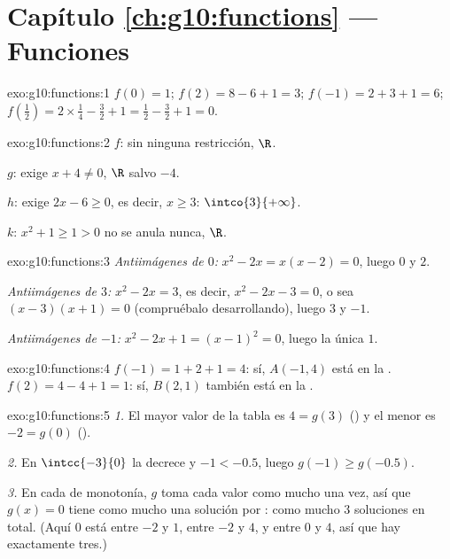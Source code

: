\section*{Capítulo \ref{ch:g10:functions} --- Funciones}

\begin{solution}{exo:g10:functions:1}
$f(0) = 1$; \quad $f(2) = 8 - 6 + 1 = 3$; \quad
$f(-1) = 2 + 3 + 1 = 6$; \quad
$f\!\left(\tfrac12\right) = 2 \times \tfrac14 - \tfrac32 + 1 = \tfrac12 -
\tfrac32 + 1 = 0$.
\end{solution}

\begin{solution}{exo:g10:functions:2}
$f$: sin ninguna restricción,  $\R$.

$g$: exige $x + 4 \neq 0$,  $\R$ salvo $-4$.

$h$: exige $2x - 6 \geq 0$, es decir, $x \geq 3$: 
$\intco{3}{+\infty}$.

$k$: $x^2 + 1 \geq 1 > 0$ no se anula nunca,  $\R$.
\end{solution}

\begin{solution}{exo:g10:functions:3}
\emph{Antiimágenes de $0$:} $x^2 - 2x = x(x-2) = 0$, luego $0$ y $2$.

\emph{Antiimágenes de $3$:} $x^2 - 2x = 3$, es decir, $x^2 - 2x - 3 = 0$,
o sea $(x-3)(x+1) = 0$ (compruébalo desarrollando), luego $3$ y $-1$.

\emph{Antiimágenes de $-1$:} $x^2 - 2x + 1 = (x - 1)^2 = 0$, luego la
única  $1$.
\end{solution}

\begin{solution}{exo:g10:functions:4}
$f(-1) = 1 + 2 + 1 = 4$: sí, $A(-1, 4)$ está en la .
$f(2) = 4 - 4 + 1 = 1$: sí, $B(2, 1)$ también está en la .
\end{solution}

\begin{solution}{exo:g10:functions:5}
\emph{1.} El mayor valor de la tabla es $4 = g(3)$ () y el menor es
$-2 = g(0)$ ().

\emph{2.} En $\intcc{-3}{0}$ la  decrece y $-1 < -0.5$, luego
$g(-1) \geq g(-0.5)$.

\emph{3.} En cada  de monotonía, $g$ toma cada valor como mucho
una vez, así que $g(x) = 0$ tiene como mucho una solución por :
como mucho $3$ soluciones en total. (Aquí $0$ está entre $-2$ y $1$, entre
$-2$ y $4$, y entre $0$ y $4$, así que hay exactamente tres.)
\end{solution}

